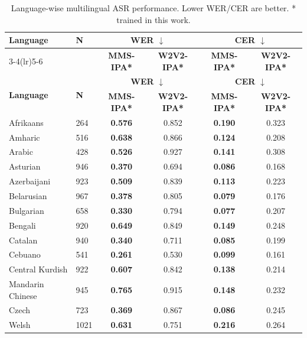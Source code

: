 \begingroup
\scriptsize
\setlength{\tabcolsep}{3pt}
\renewcommand{\arraystretch}{0.92}
\begin{longtable}{lp{0.8cm}cccc}
\caption{Language-wise multilingual ASR performance. Lower WER/CER are better. * trained in this work.}\label{tab:multilingual_asr}\\
\toprule
\multirow{2}{*}{\textbf{Language}} & \multirow{2}{*}{\textbf{N}} & \multicolumn{2}{c}{\textbf{WER} $\downarrow$} & \multicolumn{2}{c}{\textbf{CER} $\downarrow$} \\
\cmidrule(lr){3-4}\cmidrule(lr){5-6}
& & \textbf{MMS-IPA*} & \textbf{W2V2-IPA*} & \textbf{MMS-IPA*} & \textbf{W2V2-IPA*} \\
\midrule
\endfirsthead
\toprule
\multirow{2}{*}{\textbf{Language}} & \multirow{2}{*}{\textbf{N}} & \multicolumn{2}{c}{\textbf{WER} $\downarrow$} & \multicolumn{2}{c}{\textbf{CER} $\downarrow$} \\
\cmidrule(lr){3-4}\cmidrule(lr){5-6}
& & \textbf{MMS-IPA*} & \textbf{W2V2-IPA*} & \textbf{MMS-IPA*} & \textbf{W2V2-IPA*} \\
\midrule
\endhead
\bottomrule
\endfoot
Afrikaans & 264 & \textbf{0.576} & 0.852 & \textbf{0.190} & 0.323 \\
Amharic & 516 & \textbf{0.638} & 0.866 & \textbf{0.124} & 0.208 \\
Arabic & 428 & \textbf{0.526} & 0.927 & \textbf{0.141} & 0.308 \\
Asturian & 946 & \textbf{0.370} & 0.694 & \textbf{0.086} & 0.168 \\
Azerbaijani & 923 & \textbf{0.509} & 0.839 & \textbf{0.113} & 0.223 \\
Belarusian & 967 & \textbf{0.378} & 0.805 & \textbf{0.079} & 0.176 \\
Bulgarian & 658 & \textbf{0.330} & 0.794 & \textbf{0.077} & 0.207 \\
Bengali & 920 & \textbf{0.649} & 0.849 & \textbf{0.149} & 0.248 \\
Catalan & 940 & \textbf{0.340} & 0.711 & \textbf{0.085} & 0.199 \\
Cebuano & 541 & \textbf{0.261} & 0.530 & \textbf{0.099} & 0.161 \\
Central Kurdish & 922 & \textbf{0.607} & 0.842 & \textbf{0.138} & 0.214 \\
Mandarin Chinese & 945 & \textbf{0.765} & 0.915 & \textbf{0.148} & 0.232 \\
Czech & 723 & \textbf{0.369} & 0.867 & \textbf{0.086} & 0.245 \\
Welsh & 1021 & \textbf{0.631} & 0.751 & \textbf{0.216} & 0.264 \\

\end{longtable}
